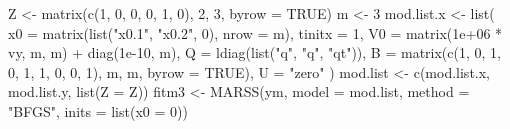 \begin{Schunk}
\begin{Sinput}
 Z <- matrix(c(1, 0, 0, 0, 1, 0), 2, 3, byrow = TRUE)
 m <- 3
 mod.list.x <- list(
   x0 = matrix(list("x0.1", "x0.2", 0), nrow = m), tinitx = 1,
   V0 = matrix(1e+06 * vy, m, m) + diag(1e-10, m),
   Q = ldiag(list("q", "q", "qt")),
   B = matrix(c(1, 0, 1, 0, 1, 1, 0, 0, 1), m, m, byrow = TRUE),
   U = "zero"
 )
 mod.list <- c(mod.list.x, mod.list.y, list(Z = Z))
 fitm3 <- MARSS(ym, model = mod.list, method = "BFGS", inits = list(x0 = 0))
\end{Sinput}
\end{Schunk}
